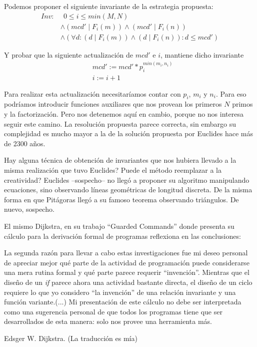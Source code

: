 \documentclass[12pt, a4paper, openany, fleqn]{book}
\begin{document}
    Podemos proponer el siguiente invariante de la estrategia propuesta:
    \begin{align*}
        Inv:&\ \  0 \leqslant i \leqslant min(M, N) \\
            &\land (mcd' \mathrel{|} F_i(m)) \land (mcd' \mathrel{|} F_i(n)) \\
            &\land (\forall d: (d \mathrel{|} F_i(m)) \land (d \mathrel{|} F_i(n)) : d \leq mcd') 
    \end{align*}

    Y probar que la siguiente actualización de $mcd'$ e $i$, mantiene dicho invariante
    \begin{align*}
        & mcd' := mcd' * p_{i}^{min(m_{i}, n_{i})} \\
        & i := i + 1
    \end{align*}

    Para realizar esta actualización necesitaríamos contar con $p_{i}$, $m_{i}$ y $n_{i}$. Para eso podríamos introducir funciones auxiliares que nos provean los primeros $N$ primos y la factorización. Pero nos detenemos aquí en cambio, porque no nos interesa seguir este camino. La resolución propuesta parece correcta, sin embargo su complejidad es mucho mayor a la de la solución propuesta por Euclides hace más de 2300 años.

    Hay alguna técnica de obtención de invariantes que nos hubiera llevado a la misma realización que tuvo Euclides? Puede el método reemplazar a la creatividad?
    Euclides --sospecho-- no llegó a proponer su algoritmo manipulando ecuaciones, sino observando líneas geométricas de longitud discreta. De la misma forma en que Pitágoras llegó a su famoso teorema observando triángulos. De nuevo, sospecho.

    El mismo Dijkstra, en su trabajo ``Guarded Commands''\cite{EWD:EWD418} donde presenta su cálculo para la derivación formal de programas reflexiona en las conclusiones:

    \begin{quoting}
        La segunda razón para llevar a cabo estas investigaciones fue mi deseo personal de apreciar mejor qué parte de la actividad de programación puede considerarse una mera rutina formal y qué parte parece requerir ``invención''. Mientras que el diseño de un \textit{if} parece ahora una actividad bastante directa, el diseño de un ciclo requiere lo que yo considero ``la invención'' de una relación invariante y una función variante.(...) Mi presentación de este cálculo no debe ser interpretada como una sugerencia personal de que todos los programas tiene que ser desarrollados de esta manera: solo nos provee una herramienta más.
    \end{quoting} Edsger W. Dijkstra. (La traducción es mía)
\end{document}
